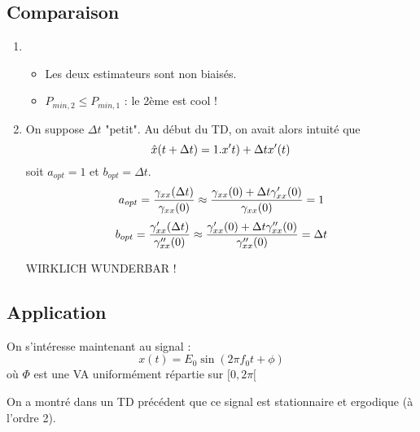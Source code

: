 \documentclass[main.tex]{subfiles}
\begin{document}
\subsection{Comparaison}
\begin{enumerate}\setlength{\itemsep}{5mm}
\item \begin{itemize}
\item Les deux estimateurs sont non biaisés.
\item $P_{min,2} \leq P_{min,1}$ : le 2ème est cool !
\end{itemize}

\item On suppose $\Delta t$ "petit". Au début du TD, on avait alors intuité que \[\hat{x}(t+\Delta t) = 1.x't) + \Delta t x'(t)\] soit $a_{opt} = 1$ et $b_{opt} =\Delta t$.
\[a_{opt} = \frac{\gamma_{xx}(\Delta t)}{\gamma_{xx}(0)} \approx \frac{\gamma_{xx}(0) + \Delta t \gamma_{xx}'(0)}{\gamma_{xx}(0)}=1\]
\[b_{opt} = \frac{\gamma_{xx}'(\Delta t)}{\gamma_{xx}''(0)} \approx \frac{\gamma_{xx}'(0) + \Delta t \gamma_{xx}''(0)}{\gamma_{xx}''(0)}=\Delta t\]

WIRKLICH WUNDERBAR !

\end{enumerate}

\subsection{Application}

On s'intéresse maintenant au signal :
\[ x(t) = E_0\sin(2\pi f_0 t+\phi) \] où $\Phi$ est une VA uniformément répartie sur $[0,2\pi[$

On a montré dans un TD précédent que ce signal est stationnaire et ergodique (à l'ordre 2).
\end{document}
